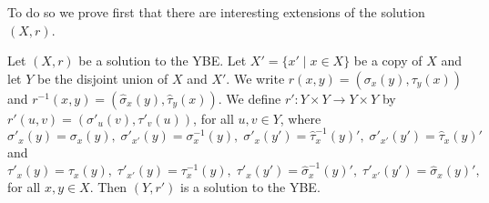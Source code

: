 To do so we prove first that there are interesting extensions of the solution $(X,r)$.

\begin{proposition}
\label{prop:extendsol}
Let $(X,r)$ be a solution to the YBE. Let $X'=\{x'\mid x\in X\}$ be a copy of $X$ and let $Y$ be the disjoint union of $X$ and $X'$. We write $r(x,y)=(\sigma_x(y),\tau_y(x))$ and $r^{-1}(x,y)=(\widehat{\sigma}_x(y),\widehat{\tau}_y(x))$. We define $r'\colon Y\times Y\rightarrow Y\times Y$ by $r'(u,v)=(\sigma'_u(v),\tau'_v(u))$, for all $u,v\in Y$, where
\[ \sigma'_x(y)=\sigma_x(y),\; \sigma'_{x'}(y)=\sigma^{-1}_x(y),\; \sigma'_{x}(y')=\widehat{\tau}^{-1}_x(y)',\; \sigma'_{x'}(y')=\widehat{\tau}_x(y)'\]
and
\[ \tau'_x(y)=\tau_x(y),\; \tau'_{x'}(y)=\tau^{-1}_x(y),\; \tau'_{x}(y')=\widehat{\sigma}^{-1}_x(y)',\; \tau'_{x'}(y')=\widehat{\sigma}_x(y)',\]
for all $x,y\in X$. Then $(Y,r')$ is a solution to the YBE.
\end{proposition}


